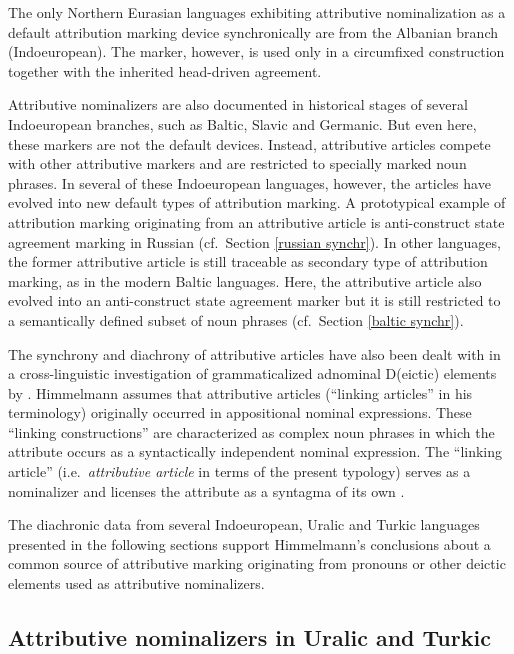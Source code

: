 The only Northern Eurasian languages exhibiting attributive nominalization as a default attribution marking device synchronically are from the Albanian branch (Indoeuropean). The marker, however,  is used only in a circumfixed construction together with the inherited head-driven agreement.

Attributive nominalizers are also documented in historical stages of several Indoeuropean branches, such as Baltic, Slavic and Germanic. But even here, these markers are not the default devices. Instead, attributive articles compete with other attributive markers and are restricted to specially marked noun phrases. In several of these Indoeuropean languages, however, the articles have evolved into new default types of attribution marking. A prototypical example of attribution marking originating from an attributive article is anti-construct state agreement marking in Russian (cf.~Section \ref{russian synchr}). In other languages, the former attributive article is still traceable as secondary type of attribution marking, as in the modern Baltic languages. Here, the attributive article also evolved into an anti-construct state agreement marker but it is still restricted to a semantically defined subset of noun phrases (cf.~Section \ref{baltic synchr}). 

The synchrony and diachrony of attributive articles have also been dealt with in a cross-linguistic investigation of grammaticalized adnominal D(eictic) elements by \cite{himmelmann1997}. Himmelmann assumes that attributive articles (“linking articles” in his terminology) originally occurred in appositional nominal expressions. These “linking constructions” are characterized as complex noun phrases in which the attribute occurs as a syntactically independent nominal expression. The “linking article” (i.e.~\textit{attributive article} in terms of the present typology) serves as a nominalizer and licenses the attribute as a syntagma of its own \cite[188]{himmelmann1997}.

The diachronic data from several Indoeuropean, Uralic and Turkic languages presented in the following sections support Himmelmann's conclusions about a common source of attributive marking originating from pronouns or other deictic elements used as attributive nominalizers.

\subsection{Attributive nominalizers in Uralic and Turkic}\label{uralic-turkic diachr}


